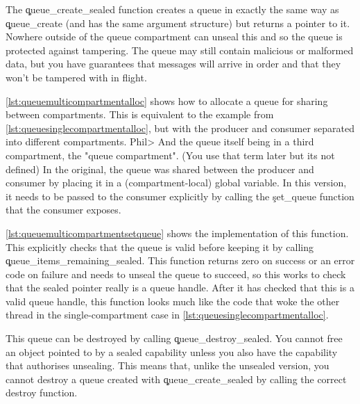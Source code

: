 The \c{queue_create_sealed} function creates a queue in exactly the same way as \c{queue_create} (and has the same argument structure) but returns a  pointer to it.
Nowhere outside of the queue compartment can unseal this and so the queue is protected against tampering.
The queue may still contain malicious or malformed data, but you have guarantees that messages will arrive in order and that they won't be tampered with in flight.


\ref{lst:queuemulticompartmentalloc} shows how to allocate a queue for sharing between compartments.
This is equivalent to the example from \ref{lst:queuesinglecompartmentalloc}, but with the producer and consumer separated into different compartments.
Phil> And the queue itself being in a third compartment, the "queue compartment". (You use that term later but its not defined)
In the original, the queue was shared between the producer and consumer by placing it in a (compartment-local) global variable.
In this version, it needs to be passed to the consumer explicitly by calling the \c{set_queue} function that the consumer exposes.

\codelisting[filename=examples/producer_consumer_compartment/producer.cc,marker=queue_allocate,label=lst:queuemulticompartmentalloc,caption="Allocating a message queue for use in a between compartments."]{}

\ref{lst:queuemulticompartmentsetqueue} shows the implementation of this function.
This explicitly checks that the queue is valid before keeping it by calling \c{queue_items_remaining_sealed}.
This function returns zero on success or an error code on failure and needs to unseal the queue to succeed, so this works to check that the sealed pointer really is a queue handle.
After it has checked that this is a valid queue handle, this function looks much like the code that woke the other thread in the single-compartment case in \ref{lst:queuesinglecompartmentalloc}.

\codelisting[filename=examples/producer_consumer_compartment/consumer.cc,marker=set_queue,label=lst:queuemulticompartmentsetqueue,caption="Receiving a queue endpoint in the consumer compartment."]{}

This queue can be destroyed by calling \c{queue_destroy_sealed}.
You cannot free an object pointed to by a sealed capability unless you also have the capability that authorises unsealing.
This means that, unlike the unsealed version, you cannot destroy a queue created with \c{queue_create_sealed}  by calling the correct destroy function.

